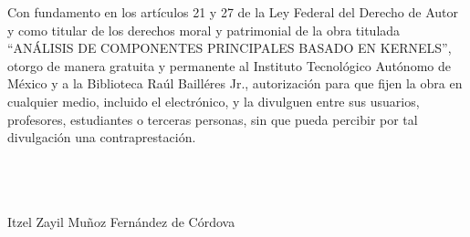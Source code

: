 \thispagestyle{empty}
\noindent Con fundamento en los artículos 21 y 27 de la Ley Federal del Derecho de Autor y como titular de los derechos moral y patrimonial de la obra titulada ``ANÁLISIS DE COMPONENTES PRINCIPALES BASADO EN KERNELS'', otorgo de manera gratuita y permanente al Instituto Tecnológico Autónomo de México y a la Biblioteca Raúl Bailléres Jr., autorización para que fijen la obra en cualquier medio, incluido el electrónico, y la divulguen entre sus usuarios, profesores, estudiantes o terceras personas, sin que pueda percibir por tal divulgación una contraprestación.\\\\\\\\

\begin{center} 
Itzel Zayil Muñoz Fernández de Córdova\\
\par\noindent\makebox[2.5in]{ }\\
\vspace{10mm}
\par\noindent\makebox[2.5in]{\hrulefill}\\
\par\noindent{}\\
\par\noindent\makebox[2.5in]{ }\\
\vspace{10mm}
\par\noindent\makebox[2.5in]{\hrulefill}\\
\par\noindent{}\\
\end{center}
\clearpage %
